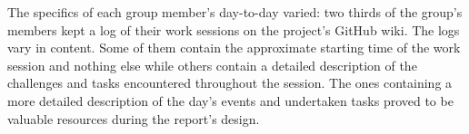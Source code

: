 The specifics of each group member's day-to-day varied: two thirds of the group's members kept a log of their work sessions on the project's GitHub wiki. 
The logs vary in content.
Some of them contain the approximate starting time of the work session and nothing else while others contain a detailed description of the challenges and tasks encountered throughout the session.
The ones containing a more detailed description of the day's events and undertaken tasks proved to be valuable resources during the report's design.
